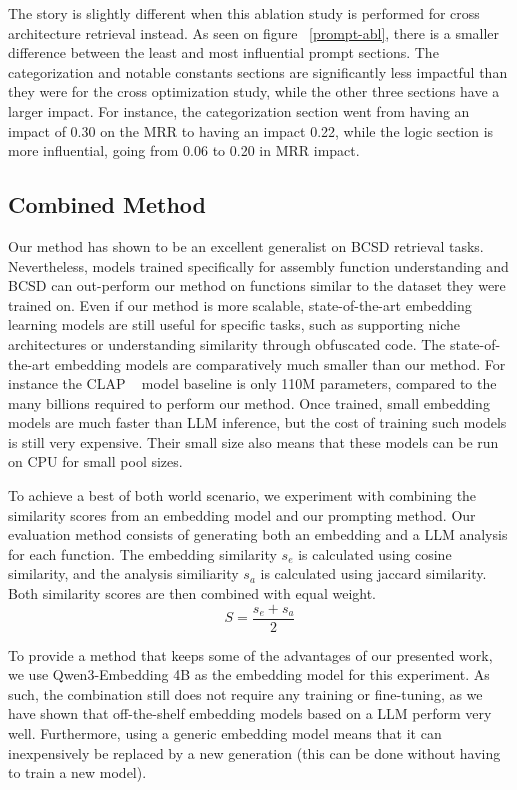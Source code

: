 \documentclass[conference,compsoc]{IEEEtran}
\begin{document}
The story is slightly different when this ablation study is performed for cross architecture retrieval instead. As seen on figure ~\ref{prompt-abl},
there is a smaller difference between the least and most influential prompt sections. The categorization and notable constants sections
are significantly less impactful than they were for the cross optimization study, while the other three sections have a larger impact.
For instance, the categorization section went from having an impact of 0.30 on the MRR to having an impact 0.22, while the logic
section is more influential, going from 0.06 to 0.20 in MRR impact.

\subsection{Combined Method}

Our method has shown to be an excellent generalist on BCSD retrieval tasks. Nevertheless, models trained specifically for assembly
function understanding and BCSD can out-perform our method on functions similar to the dataset they were trained on.
Even if our method is more scalable, state-of-the-art embedding learning models are still useful for specific tasks, such as supporting
niche architectures or understanding similarity through obfuscated code. The state-of-the-art embedding models are comparatively much smaller
than our method. For instance the CLAP ~\cite{CLAP} model baseline is only 110M parameters, compared to the many billions required to perform our method.
Once trained, small embedding models are much faster than LLM inference, but the cost of training such models is still very expensive.
Their small size also means that these models can be run on CPU for small pool sizes.

To achieve a best of both world scenario, we experiment with combining the similarity scores from an embedding model and our prompting method.
Our evaluation method consists of generating both an embedding and a LLM analysis for each function. The embedding similarity \(s_e\) is calculated
using cosine similarity, and the analysis similiarity \(s_a\) is calculated using jaccard similarity. Both similarity scores are then combined
with equal weight.
\[
    S = \frac{s_e + s_a}{2}
\]

To provide a method that keeps some of the advantages of our presented work, we use Qwen3-Embedding 4B as the embedding model for this experiment.
As such, the combination still does not require any training or fine-tuning, as we have shown that off-the-shelf embedding models based on a LLM perform
very well. Furthermore, using a generic embedding model means that it can inexpensively be replaced by a new generation (this can be done without
having to train a new model). 
\end{document}
